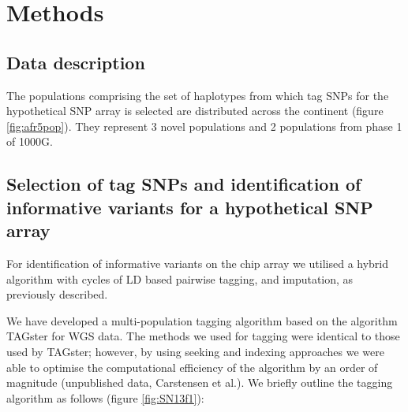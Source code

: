 \section{Methods}
\label{sec:methods_chip}

\subsection{Data description}
The populations comprising the set of haplotypes from which tag \glspl{SNP} for the hypothetical \gls{SNP} array is selected are distributed across the continent (figure \ref{fig:afr5pop}). They represent 3 novel populations and 2 populations from phase 1 of \gls{1000G}.


\subsection{Selection of tag SNPs and identification of informative variants for a hypothetical SNP array}

For identification of informative variants on the chip array we utilised a hybrid algorithm with cycles of \gls{LD} based pairwise tagging, and imputation, as previously described.\cite{Hoffmann2011422}

We have developed a multi-population tagging algorithm based on the algorithm TAGster for \gls{WGS} data.\cite{Xu2007} The methods we used for tagging were identical to those used by TAGster; however, by using seeking and indexing approaches we were able to optimise the computational efficiency of the algorithm by an order of magnitude (unpublished data, Carstensen et al.). We briefly outline the tagging algorithm as follows (figure \ref{fig:SN13f1}):

